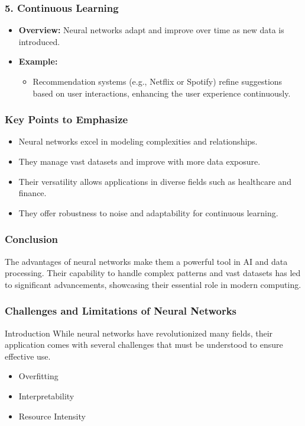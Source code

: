 \documentclass[aspectratio=169]{beamer}
\begin{document}
\begin{frame}[fragile]
    \frametitle{5. Continuous Learning}
    \begin{itemize}
        \item \textbf{Overview:} Neural networks adapt and improve over time as new data is introduced.
        \item \textbf{Example:} 
        \begin{itemize}
            \item Recommendation systems (e.g., Netflix or Spotify) refine suggestions based on user interactions, enhancing the user experience continuously.
        \end{itemize}
    \end{itemize}
\end{frame}

\begin{frame}[fragile]
    \frametitle{Key Points to Emphasize}
    \begin{itemize}
        \item Neural networks excel in modeling complexities and relationships.
        \item They manage vast datasets and improve with more data exposure.
        \item Their versatility allows applications in diverse fields such as healthcare and finance.
        \item They offer robustness to noise and adaptability for continuous learning.
    \end{itemize}
\end{frame}

\begin{frame}[fragile]
    \frametitle{Conclusion}
    The advantages of neural networks make them a powerful tool in AI and data processing. Their capability to handle complex patterns and vast datasets has led to significant advancements, showcasing their essential role in modern computing.
\end{frame}

\begin{frame}[fragile]
    \frametitle{Challenges and Limitations of Neural Networks}
    \begin{block}{Introduction}
        While neural networks have revolutionized many fields, their application comes with several challenges that must be understood to ensure effective use. 
    \end{block}
    \begin{itemize}
        \item Overfitting
        \item Interpretability
        \item Resource Intensity
    \end{itemize}
\end{frame}
\end{document}
